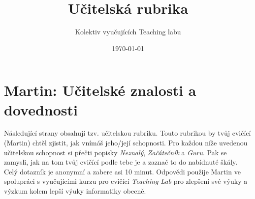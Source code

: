\documentclass{article}
\title{Učitelská rubrika}
\author{Kolektiv vyučujících Teaching labu}
\date{\today}
\newcommand{\teacherName}{Martin\xspace}
\begin{document}
\section*{\teacherName: Učitelské znalosti a dovednosti}
\label{rubric}

\begin{onehalfspace}
\large 
Následující strany obsahují tzv. učitelskou rubriku. Touto rubrikou by tvůj cvičící (\teacherName) chtěl zjistit, jak vnímáš jeho/její schopnosti. Pro každou níže uvedenou učitelskou schopnost si přečti popisky \textit{Neznalý}, \textit{Začátečník} a \textit{Guru}. Pak se zamysli, jak na tom tvůj cvičící podle tebe je a zaznač to do nabídnuté škály. Celý dotazník je anonymní a zabere asi 10 minut. Odpovědi použije \teacherName ve spolupráci s vyučujícími kurzu pro cvičící \textit{Teaching Lab} pro zlepšení své výuky a výzkum kolem lepší výuky informatiky obecně.
\end{onehalfspace}
\bigskip
\end{document}

